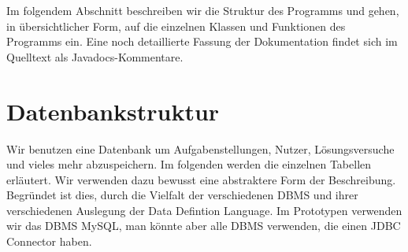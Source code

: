 



Im folgendem Abschnitt beschreiben wir die Struktur des Programms und gehen, in übersichtlicher Form, auf die einzelnen Klassen und Funktionen des Programms ein. Eine noch detaillierte Fassung der Dokumentation findet sich im Quelltext als Javadocs-Kommentare.

\section{Datenbankstruktur}

Wir benutzen eine Datenbank um Aufgabenstellungen, Nutzer, Lösungsversuche und vieles mehr abzuspeichern. Im folgenden werden die einzelnen Tabellen erläutert. Wir verwenden dazu bewusst eine abstraktere Form der Beschreibung. Begründet ist dies, durch die Vielfalt der verschiedenen DBMS und ihrer verschiedenen Auslegung der Data Defintion Language. Im Prototypen verwenden wir das DBMS MySQL, man könnte aber alle DBMS verwenden, die einen JDBC Connector haben.

